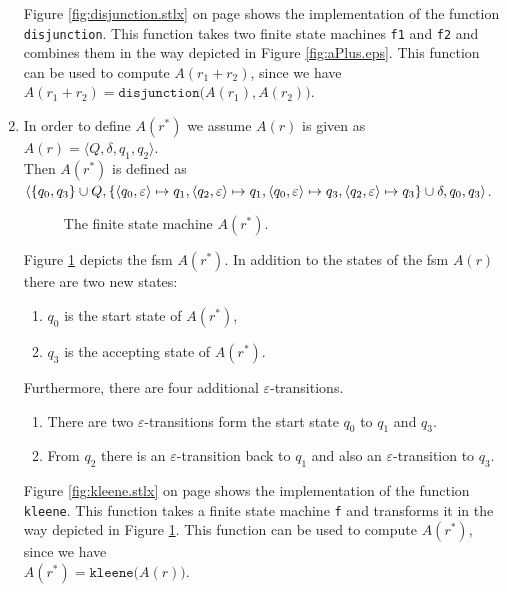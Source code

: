 \begin{enumerate}
      Figure \ref{fig:disjunction.stlx} on page \pageref{fig:disjunction.stlx} shows the
      implementation of the function \texttt{disjunction}.  This function takes two
      finite state machines \texttt{f1} and \texttt{f2} and combines them in the way
      depicted in Figure \ref{fig:aPlus.eps}.  This function can be used
      to compute $A(r_1 + r_2)$, since we have
      \\[0.2cm]
      \hspace*{1.3cm}
      $A(r_1 +r_2) = \mathtt{disjunction}\bigl(A(r_1), A(r_2)\bigr)$.
\item In order to define $A(r^*)$ we assume $A(r)$ is given as
      \\[0.2cm]
      \hspace*{1.3cm}
      $A(r) = \langle Q, \delta, q_1, q_2 \rangle$.
      \\[0.2cm]
      Then  $A(r^*)$ is defined as
      \\[0.2cm]
      \hspace*{0.8cm}
       $\langle \{ q_0, q_3 \} \cup Q, 
                \{ \pair(q_0,\varepsilon) \mapsto q_1, \pair(q_2,\varepsilon) \mapsto q_1,
                   \pair(q_0,\varepsilon) \mapsto q_3, \pair(q_2,\varepsilon) \mapsto q_3 \} 
                   \cup \delta, q_0, q_3  \rangle$.
      \\[0.2cm]

      \begin{figure}[!ht]
        \centering
      \caption{The finite state machine $A(r^*)$.}
      \label{fig:aStar.eps}
      \end{figure}

      Figure \ref{fig:aStar.eps} depicts the fsm $A(r^*)$.
      In addition to the states of the fsm  $A(r)$ there are two new states:
      \begin{enumerate}
      \item $q_0$ is the start state of $A(r^*)$,
      \item $q_3$ is the accepting state of $A(r^*)$.
      \end{enumerate}
      Furthermore, there are four additional  $\varepsilon$-transitions.
      \begin{enumerate}
      \item There are two $\varepsilon$-transitions form the start state $q_0$ to $q_1$ and $q_3$.
      \item From $q_2$ there is an  $\varepsilon$-transition back to $q_1$ and also an
            $\varepsilon$-transition to $q_3$.
      \end{enumerate}
      Figure \ref{fig:kleene.stlx} on page \pageref{fig:kleene.stlx} shows the
      implementation of the function \texttt{kleene}.  This function takes a
      finite state machine \texttt{f} and transforms it in the way
      depicted in Figure \ref{fig:aStar.eps}.  This function can be used
      to compute $A(r^*)$, since we have
      \\[0.2cm]
      \hspace*{1.3cm}
      $A(r^*) = \mathtt{kleene}\bigl(A(r)\bigr)$.
 

\end{enumerate}
